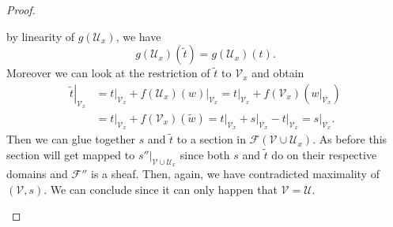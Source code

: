 \documentclass[../Main]{subfiles}
\begin{document}
\begin{proof}
\begin{enumerate}
		by linearity of $g(\mathcal{U}_x)$, we have
		\begin{equation}
			g(\mathcal{U}_x)(\tilde{t}) =
			g(\mathcal{U}_x)(t)
		.\end{equation}
		Moreover we can look at the restriction of $\tilde{t}$ to $\mathcal{V}_x$
		and obtain
		\begin{align}
			\left.\tilde{t}\right|_{\mathcal{V}_x} &=
			\left.t\right|_{\mathcal{V}_x} +
			\left.f(\mathcal{U}_x)(w)\right|_{\mathcal{V}_x} =
			\left.t\right|_{\mathcal{V}_x} +
			f(\mathcal{V}_x)(\left.w\right|_{\mathcal{V}_x})\\
			&=
			\left.t\right|_{\mathcal{V}_x} + f(\mathcal{V}_x)(\tilde{w}) =
			\left.t\right|_{\mathcal{V}_x} +
			\left.s\right|_{\mathcal{V}_x} -
			\left.t\right|_{\mathcal{V}_x} =
			\left.s\right|_{\mathcal{V}_x}
		.\end{align}
		Then we can glue together $s$ and $\tilde{t}$ to a section in
		$\mathcal{F}(\mathcal{V}\cup \mathcal{U}_x)$.
		As before this section will get mapped to $\left.s''\right|_{\mathcal{V} \cup \mathcal{U}_x}$
		since both $s$ and $\tilde{t}$ do on their respective domains
		and $\mathcal{F}''$ is a sheaf.
		Then, again, we have contradicted maximality of $\left(\mathcal{V}, s\right)$.
		We can conclude since it can only happen that $\mathcal{V} = \mathcal{U}$.\qedhere
\end{enumerate}
\end{proof}
\end{document}
